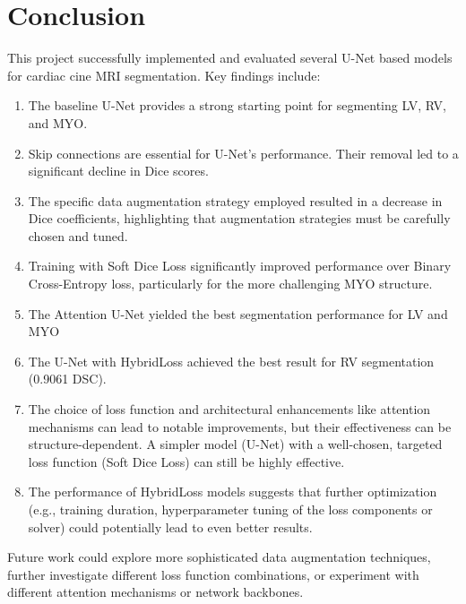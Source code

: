 \documentclass{article}
\begin{document}
\section{Conclusion}
This project successfully implemented and evaluated several U-Net based models for cardiac cine MRI segmentation. Key findings include:
\begin{enumerate}
  \item The baseline U-Net provides a strong starting point for segmenting LV, RV, and MYO.
  \item Skip connections are essential for U-Net's performance. Their removal led to a significant decline in Dice scores.
  \item The specific data augmentation strategy employed resulted in a decrease in Dice coefficients, highlighting that augmentation strategies must be carefully chosen and tuned.
  \item Training with Soft Dice Loss significantly improved performance over Binary Cross-Entropy loss, particularly for the more challenging MYO structure.
  \item The Attention U-Net yielded the best segmentation performance for LV and MYO
  \item The U-Net with HybridLoss achieved the best result for RV segmentation (0.9061 DSC).
  \item The choice of loss function and architectural enhancements like attention mechanisms can lead to notable improvements, but their effectiveness can be structure-dependent. A simpler model (U-Net) with a well-chosen, targeted loss function (Soft Dice Loss) can still be highly effective.
  \item The performance of HybridLoss models suggests that further optimization (e.g., training duration, hyperparameter tuning of the loss components or solver) could potentially lead to even better results.
\end{enumerate}
Future work could explore more sophisticated data augmentation techniques, further investigate different loss function combinations, or experiment with different attention mechanisms or network backbones.
\end{document}
